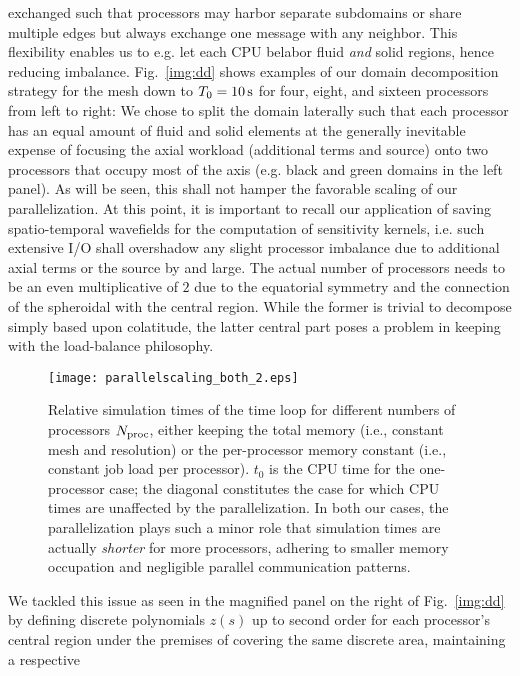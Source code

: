 exchanged such that processors may harbor separate subdomains or share 
multiple edges but always exchange one message with any neighbor. 
This flexibility enables us to e.g. let each CPU belabor fluid {\it and} solid regions, 
hence reducing imbalance.
%
Fig.~\ref{img:dd} shows examples of our domain decomposition strategy 
for the mesh down to $T_0=10\,{\rm s}$ for four, eight, and sixteen 
processors from left to right: 
We chose to split the domain laterally such that each processor has an 
equal amount of fluid and solid elements at the generally inevitable expense of 
focusing the axial workload (additional terms and source) onto two 
processors that occupy most of the axis (e.g. black and green domains in the 
left panel). 
%
As will be seen, this shall not hamper the favorable scaling of 
our parallelization. At this point, it is important to recall our application of 
saving spatio-temporal wavefields for the computation of sensitivity kernels, 
i.e. such extensive I/O shall overshadow any slight processor imbalance due to
additional axial terms or the source by and large. 
The actual number of processors needs to be an even 
multiplicative of $2$ due to the equatorial symmetry and the connection
of the spheroidal with the central region. While the former is trivial to 
decompose simply based upon colatitude, the latter central part poses 
a problem in keeping with the load-balance philosophy.
%
\begin{figure}[tb!]
\begin{center}
\texttt{[image: parallelscaling\_both\_2.eps]}
\caption{Relative simulation times of the time loop for different numbers of processors 
$N_{\rm proc}$, either keeping the total memory (i.e., constant mesh and resolution) 
or the per-processor memory constant (i.e., constant job load per processor). $t_0$ 
is the CPU time for the one-processor case;
the diagonal constitutes the case for which CPU times are unaffected by the parallelization. 
In both our cases, the parallelization 
plays such a minor role that simulation times are actually \textit{shorter} for more processors, 
adhering to smaller memory occupation and negligible parallel communication patterns.} 
\label{img:scaling}
\end{center}
\end{figure}
%
We tackled this issue as seen in the magnified panel on the right of 
Fig.~\ref{img:dd} by defining discrete polynomials $z(s)$ up to 
second order for each processor's central region under the premises of 
covering the same discrete area, maintaining a respective 
